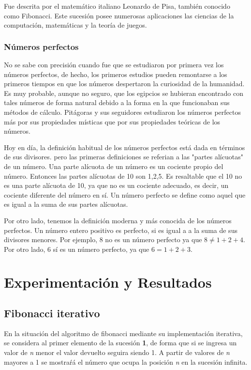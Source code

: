 \documentclass{report}
\begin{document}
        Fue descrita por el matemático italiano Leonardo de Pisa, también conocido como Fibonacci. Este sucesión posee numerosas aplicaciones las ciencias de la computación, matemáticas y la teoría de juegos.
    \subsubsection*{Números perfectos}
        No se sabe con precisión cuando fue que se estudiaron por primera vez los números perfectos, de hecho, los primeros estudios pueden remontarse a los primeros tiempos en que los números despertaron la curiosidad de la humanidad. Es muy probable, aunque no seguro, que los egipcios se hubieran encontrado con tales números de forma natural debido a la forma en la que funcionaban sus métodos de cálculo. Pitágoras y sus seguidores estudiaron los números perfectos más por sus propiedades místicas que por sus propiedades teóricas de los números.
        
        \hfill \break

        Hoy en día, la definición habitual de los números perfectos está dada en términos de sus divisores. pero las primeras definiciones se referian a las "partes alícuotas" de un número. Una parte alícuota de un número es un cociente propio del número. Entonces las partes alícuotas de 10 son 1,2,5. Es resaltable que el 10 no es una parte alícuota de 10, ya que no es un cociente adecuado, es decir, un cociente diferente del número en sí. Un número perfecto se define como aquel que es igual a la suma de sus partes alícuotas.
        
        \hfill \break
        
        Por otro lado, tenemos la definición moderna y más conocida de los números perfectos. Un número entero positivo es perfecto, si es igual a a la suma de sus divisores menores. Por ejemplo, 8 no es un número perfecto ya que $8\neq 1 + 2 + 4$. Por otro lado, 6 sí es un número perfecto, ya que $6 = 1 + 2 + 3$. 
\newpage

\section*{Experimentación y Resultados}
    
    \hfill \break
    \hfill \break

    \subsection*{Fibonacci iterativo}
        En la situación del algoritmo de fibonacci mediante su implementación iterativa, se considera al primer elemento de la sucesión \textbf{1}, de forma que si se ingresa un valor de \textit{n} menor el valor devuelto seguira siendo 1. A partir de valores de \textit{n} mayores a 1 se mostraŕá el número que ocupa la posición \textit{n} en la sucesión infinita.
\end{document}
